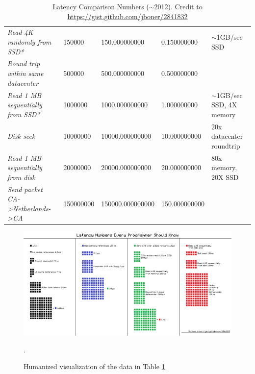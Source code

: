 \begin{table}[]
{\begin{tabular}{lllll}
    \textit{Read 4K randomly from SSD*}                                & 150000                 & 150.000000000           & 0.150000000             & $\sim$1GB/sec SSD                                          \\
    \textit{Round trip within same datacenter}                         & 500000                 & 500.000000000           & 0.500000000             &                                                            \\
    \textit{Read 1 MB sequentially from SSD*}                          & 1000000                & 1000.000000000          & 1.000000000             & $\sim$1GB/sec SSD, 4X memory                               \\
    \textit{Disk seek}                                                 & 10000000               & 10000.000000000         & 10.000000000            & 20x datacenter roundtrip                                   \\
    \textit{Read 1 MB sequentially from disk}                          & 20000000               & 20000.000000000         & 20.000000000            & 80x memory, 20X SSD                                        \\
    \textit{Send packet CA-\textgreater{}Netherlands-\textgreater{}CA} & 150000000              & 150000.000000000        & 150.000000000           &                                                           
    \end{tabular}%
    }
    \caption{Latency Comparison Numbers ($\sim$2012). Credit to \url{https://gist.github.com/jboner/2841832}}
    \label{tab:refernce_latencies}
\end{table}
\FloatBarrier


\begin{figure}
	\centering
	\includegraphics[width=\textwidth]{sources/appendices/images/latencies-refernece.png}
	\caption[]{Humanized visualization of the data in Table 
    \ref{tab:refernce_latencies}}.
	\label{fig:refernce_latencies}
\end{figure}

\FloatBarrier
